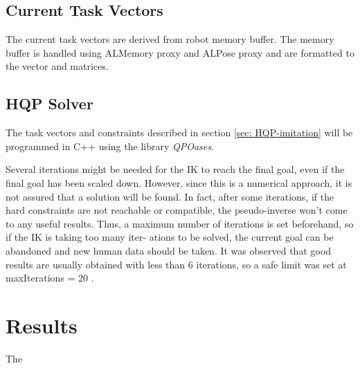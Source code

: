 \subsection*{Current Task Vectors}

The current task vectors are derived from robot memory buffer. The memory buffer is handled using ALMemory proxy and ALPose proxy and are formatted to the vector and matrices.

\subsection*{HQP Solver}

The task vectors and constraints described in section \ref{sec: HQP-imitation} will be programmed in C++ using the library \textit{QPOases}. 

Several iterations might be needed for the IK to reach the final goal, even if the final goal has been scaled down. However, since this is a numerical approach, 
it is not assured that a solution will be found. In fact, after some iterations, if the hard constraints are not reachable or compatible, the pseudo-inverse won’t 
come to any useful results. Thus, a maximum number of iterations is set beforehand, so if the IK is taking too many iter- ations to be solved, the current goal can 
be abandoned and new human data should be taken. It was observed that good results are usually obtained with less than 6 iterations, so a safe limit was set at 
maxIterations = 20 \cite{louisepouble}.

\section{Results}

The 